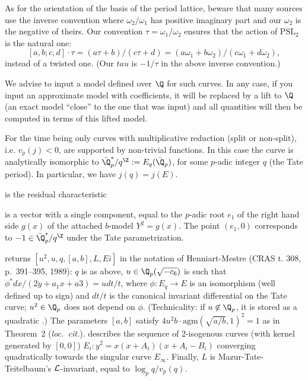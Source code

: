  As for the orientation of the basis of the period lattice,
beware that many sources use the inverse convention where $\omega_2/\omega_1$
has positive imaginary part and our $\omega_2$ is the negative of theirs. Our
convention $\tau = \omega_1/\omega_2$  ensures that the action of $\text{PSL}_2$ is the natural
one:
$$[a,b;c,d]\cdot\tau = (a\tau+b)/(c\tau+d)
  = (a \omega_1 + b\omega_2)/(c\omega_1 + d\omega_2),$$
instead of a twisted one. (Our $tau$ is $-1/\tau$ in the above inverse
convention.)


We advise to input a model defined over $\Q$ for such curves. In any case,
if you input an approximate model with  coefficients, it will be
replaced by a lift to $\Q$ (an exact model ``close'' to the one that was
input) and all quantities will then be computed in terms of this lifted
model.

For the time being only curves with multiplicative reduction (split or
non-split), i.e. $v_p(j) < 0$, are supported by non-trivial functions. In
this case the curve is analytically isomorphic to $\bar{\Q}_p^*/q^\Z :=
E_q(\bar{\Q}_p)$, for some $p$-adic integer $q$ (the Tate period). In
particular, we have $j(q) = j(E)$.

\item {} is the residual characteristic

\item {} is a vector with a single component, equal to the $p$-adic
root $e_1$ of the right hand side $g(x)$ of the attached $b$-model $Y^2
= g(x)$. The point $(e_1,0)$ corresponds to $-1 \in \bar{\Q}_p^*/q^\Z$
under the Tate parametrization.

\item {} returns $[u^2,u,q,[a,b],L, Ei]$ in the notation of Henniart-Mestre
(CRAS t. 308, p.~391--395, 1989): $q$ is as above, $u\in \Q_p(\sqrt{-c_6})$
is such that $\phi^* dx/(2y + a_1x+a3) = u dt/t$, where $\phi: E_q\to E$
is an isomorphism (well defined up to sign) and $dt/t$ is the canonical
invariant differential on the Tate curve; $u^2\in\Q_p$ does not depend on
$\phi$. (Technicality: if $u\not\in\Q_p$, it is stored as a quadratic
.)
The parameters $[a,b]$ satisfy $4u^2 b \cdot \text{agm}(\sqrt{a/b},1)^2 = 1$
as in Theorem~2 (\emph{loc.~cit.}).
 describes the sequence of 2-isogenous curves (with kernel generated
by $[0,0]$) $E_i: y^2=x(x+A_i)(x+A_i-B_i)$ converging quadratically towards
the singular curve $E_\infty$. Finally, $L$ is Mazur-Tate-Teitelbaum's
${\cal L}$-invariant, equal to $\log_p q / v_p(q)$.

